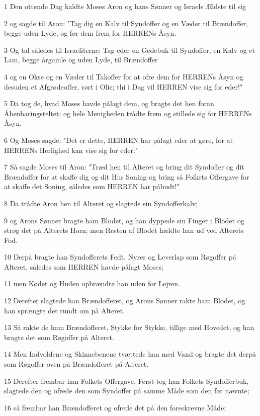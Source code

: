 \par 1 Den ottende Dag kaldte Moses Aron og hans Sønner og Israels Ældste til sig
\par 2 og sagde til Aron: "Tag dig en Kalv til Syndoffer og en Væder til Brændoffer, begge uden Lyde, og før dem frem for HERRENs Åsyn.
\par 3 Og tal således til Israeliterne: Tag eder en Gedebuk til Syndoffer, en Kalv og et Lam, begge årgamle og uden Lyde, til Brændoffer
\par 4 og en Okse og en Væder til Takoffer for at ofre dem for HERRENs Åsyn og desuden et Afgrødeoffer, rørt i Olie; thi i Dag vil HERREN vise sig for eder!"
\par 5 Da tog de, hvad Moses havde pålagt dem, og bragte det hen foran Åbenbaringsteltet; og hele Menigheden trådte frem og stillede sig for HERRENs Åsyn.
\par 6 Og Moses sagde: "Det er dette, HERREN har pålagt eder at gøre, for at HERRENs Herlighed kan vise sig for eder."
\par 7 Så sagde Moses til Aron: "Træd hen til Alteret og bring dit Syndoffer og dit Brændoffer for at skaffe dig og dit Hus Soning og bring så Folkets Offergave for at skaffe det Soning, således som HERREN har påbudt!"
\par 8 Da trådte Aron hen til Alteret og slagtede sin Syndofferkalv;
\par 9 og Arons Sønner bragte ham Blodet, og han dyppede sin Finger i Blodet og strøg det på Alterets Horn; men Resten af Blodet hældte han ud ved Alterets Fod.
\par 10 Derpå bragte han Syndofferets Fedt, Nyrer og Leverlap som Røgoffer på Alteret, således som HERREN havde pålagt Moses;
\par 11 men Kødet og Huden opbrændte han uden for Lejren.
\par 12 Derefter slagtede han Brændofferet, og Arons Sønner rakte ham Blodet, og han sprængte det rundt om på Alteret.
\par 13 Så rakte de ham Brændofferet, Stykke for Stykke, tillige med Hovedet, og han bragte det som Røgoffer på Alteret.
\par 14 Men Indvoldene og Skinnebenene tvættede han med Vand og bragte det derpå som Røgoffer oven på Brændofferet på Alteret.
\par 15 Derefter frembar han Folkets Offergave. Først tog han Folkets Syndofferbuk, slagtede den og ofrede den som Syndoffer på samme Måde som den før nævnte;
\par 16 så frembar han Brændofferet og ofrede det på den foreskrevne Måde;
